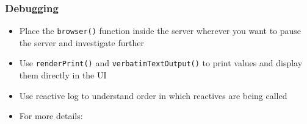 \documentclass[
	11pt, %
]{beamer}
\begin{document}
\begin{frame}
	\frametitle{Debugging}
	
	\begin{itemize}
	\item Place the \texttt{browser()} function inside the server wherever you want to pause the server and investigate further
	\item Use \texttt{renderPrint()} and \texttt{verbatimTextOutput()} to print values and display them directly in the UI
	\item Use reactive log to understand order in which reactives are being called
	\item For more details: \href{https://shiny.posit.co/r/articles/improve/debugging/}{\color{blue}{https://shiny.posit.co/r/articles/improve/debugging/}} 

	\end{itemize}
	
\end{frame}

\end{document}
